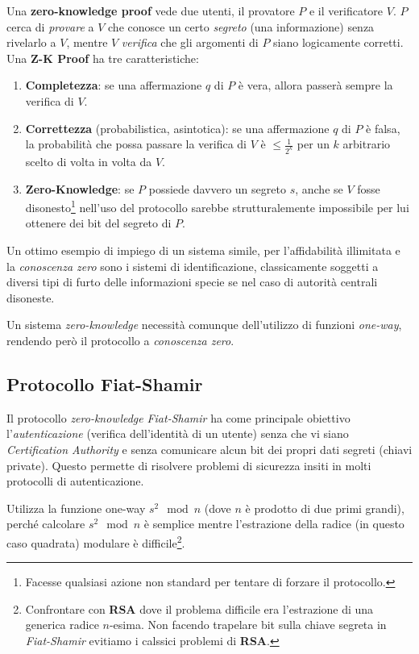 \documentclass{article}
\begin{document}
Una \textbf{zero-knowledge proof} vede due utenti, il provatore $P$ e il verificatore $V$. $P$ cerca di \textit{provare} a $V$ che conosce un certo \textit{segreto} (una informazione) senza rivelarlo a $V$, mentre $V$ \textit{verifica} che gli argomenti di $P$ siano logicamente corretti. Una \textbf{Z-K Proof} ha tre caratteristiche:
\begin{enumerate}
    \item[] \textbf{Completezza}: se una affermazione $q$ di $P$ è vera, allora passerà sempre la verifica di $V$.
    
    \item[] \textbf{Correttezza} (probabilistica, asintotica): se una affermazione $q$ di $P$ è falsa, la probabilità che possa passare la verifica di $V$ è $\le \frac{1}{2^k}$ per un $k$ arbitrario scelto di volta in volta da $V$.
    
    \item[] \textbf{Zero-Knowledge}: se $P$ possiede davvero un segreto $s$, anche se $V$ fosse disonesto\footnote{Facesse qualsiasi azione non standard per tentare di forzare il protocollo.} nell'uso del protocollo sarebbe strutturalemente impossibile per lui ottenere dei bit del segreto di $P$.
\end{enumerate}

Un ottimo esempio di impiego di un sistema simile, per l'affidabilità illimitata e la \textit{conoscenza zero} sono i sistemi di identificazione, classicamente soggetti a diversi tipi di furto delle informazioni specie se nel caso di autorità centrali disoneste. 

Un sistema \textit{zero-knowledge} necessità comunque dell'utilizzo di funzioni \textit{one-way}, rendendo però il protocollo a \textit{conoscenza zero}.

\subsection{Protocollo Fiat-Shamir}
Il protocollo \textit{zero-knowledge} \textit{Fiat-Shamir} ha come principale obiettivo l'\textit{autenticazione} (verifica dell'identità di un utente) senza che vi siano \textit{Certification Authority} e senza comunicare alcun bit dei propri dati segreti (chiavi private). Questo permette di risolvere problemi di sicurezza insiti in molti protocolli di autenticazione. 

Utilizza la funzione one-way $s^2\mod n$ (dove $n$ è prodotto di due primi grandi), perché calcolare $s^2 \mod n$ è semplice mentre l'estrazione della radice (in questo caso quadrata) modulare è difficile\footnote{Confrontare con \textbf{RSA} dove il problema difficile era l'estrazione di una generica radice $n$-esima. Non facendo trapelare bit sulla chiave segreta in \textit{Fiat-Shamir} evitiamo i calssici problemi di \textbf{RSA}.}.
\end{document}
